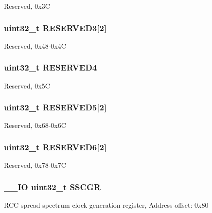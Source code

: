 Reserved, 0x3\-C \hypertarget{struct_r_c_c___type_def_ab6f0f833dbe064708de75d95c68c32fd}{
\subsubsection[{R\-E\-S\-E\-R\-V\-E\-D3}]{\setlength{\rightskip}{0pt plus 5cm}uint32\-\_\-t R\-E\-S\-E\-R\-V\-E\-D3\mbox{[}2\mbox{]}}}\label{struct_r_c_c___type_def_ab6f0f833dbe064708de75d95c68c32fd}
Reserved, 0x48-\/0x4\-C \hypertarget{struct_r_c_c___type_def_ac0018930ee9f18afda25b695b9a4ec16}{
\subsubsection[{R\-E\-S\-E\-R\-V\-E\-D4}]{\setlength{\rightskip}{0pt plus 5cm}uint32\-\_\-t R\-E\-S\-E\-R\-V\-E\-D4}}\label{struct_r_c_c___type_def_ac0018930ee9f18afda25b695b9a4ec16}
Reserved, 0x5\-C \hypertarget{struct_r_c_c___type_def_ac0eb05794aeee3b4ed69c8fe54c9be3b}{
\subsubsection[{R\-E\-S\-E\-R\-V\-E\-D5}]{\setlength{\rightskip}{0pt plus 5cm}uint32\-\_\-t R\-E\-S\-E\-R\-V\-E\-D5\mbox{[}2\mbox{]}}}\label{struct_r_c_c___type_def_ac0eb05794aeee3b4ed69c8fe54c9be3b}
Reserved, 0x68-\/0x6\-C \hypertarget{struct_r_c_c___type_def_a10da398d74a1f88d5b42bd40718d9447}{
\subsubsection[{R\-E\-S\-E\-R\-V\-E\-D6}]{\setlength{\rightskip}{0pt plus 5cm}uint32\-\_\-t R\-E\-S\-E\-R\-V\-E\-D6\mbox{[}2\mbox{]}}}\label{struct_r_c_c___type_def_a10da398d74a1f88d5b42bd40718d9447}
Reserved, 0x78-\/0x7\-C \hypertarget{struct_r_c_c___type_def_aaef3da59eaf7c6dfdf9a12fd60ce58a8}{
\subsubsection[{S\-S\-C\-G\-R}]{\setlength{\rightskip}{0pt plus 5cm}\-\_\-\-\_\-\-I\-O uint32\-\_\-t S\-S\-C\-G\-R}}\label{struct_r_c_c___type_def_aaef3da59eaf7c6dfdf9a12fd60ce58a8}
R\-C\-C spread spectrum clock generation register, Address offset\-: 0x80 

